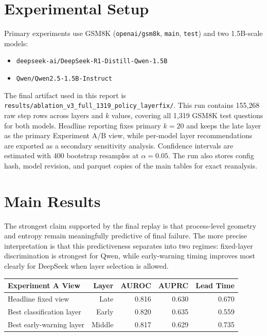 \documentclass{article}
\begin{document}
\section{Experimental Setup}
Primary experiments use GSM8K (\texttt{openai/gsm8k}, \texttt{main}, \texttt{test}) and two 1.5B-scale models:

\begin{itemize}
    \item \texttt{deepseek-ai/DeepSeek-R1-Distill-Qwen-1.5B}
    \item \texttt{Qwen/Qwen2.5-1.5B-Instruct}
\end{itemize}

The final artifact used in this report is \texttt{results/ablation\_v3\_full\_1319\_policy\_layerfix/}. This run contains 155{,}268 raw step rows across layers and $k$ values, covering all 1{,}319 GSM8K test questions for both models. Headline reporting fixes primary $k=20$ and keeps the late layer as the primary Experiment A/B view, while per-model layer recommendations are exported as a secondary sensitivity analysis. Confidence intervals are estimated with 400 bootstrap resamples at $\alpha=0.05$. The run also stores config hash, model revision, and parquet copies of the main tables for exact reanalysis.

\section{Main Results}
The strongest claim supported by the final replay is that process-level geometry and entropy remain meaningfully predictive of final failure. The more precise interpretation is that this predictiveness separates into two regimes: fixed-layer discrimination is strongest for Qwen, while early-warning timing improves most clearly for DeepSeek when layer selection is allowed.

\begin{center}
\begin{tabular}{lrrrr}
\toprule
Experiment A View & Layer & AUROC & AUPRC & Lead Time \\
\midrule
Headline fixed view & Late & 0.816 & 0.630 & 0.670 \\
Best classification layer & Early & 0.820 & 0.635 & 0.559 \\
Best early-warning layer & Middle & 0.817 & 0.629 & 0.735 \\
\bottomrule
\end{tabular}
\end{center}
\end{document}

